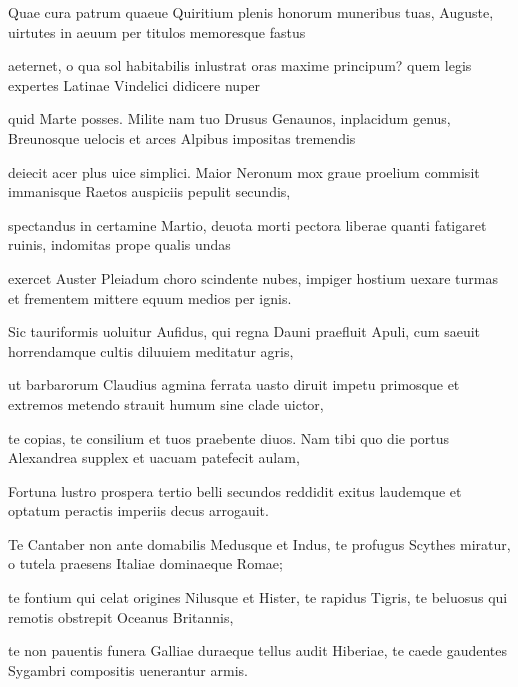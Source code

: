 \documentclass{book}
\newenvironment {carmen} [1] [\relax] 
  {\Titulus \Versus \incipit*\numerus{1}#1}
  {\endVersus}
\newcommand {\Alcaic}    {\Forma \strophae {0 \poena 01 \poena 2}}
\begin{document}
\begin{carmen}[\Alcaic]


Quae cura patrum quaeue Quiritium
 plenis honorum muneribus tuas,
      Auguste, uirtutes in aeuum
      per titulos memoresque fastus
 
aeternet, o qua sol habitabilis               
 inlustrat oras maxime principum?
      quem legis expertes Latinae
      Vindelici didicere nuper
 
quid Marte posses. Milite nam tuo
 Drusus Genaunos, inplacidum genus,               
      Breunosque uelocis et arces
      Alpibus impositas tremendis
 
deiecit acer plus uice simplici.
 Maior Neronum mox graue proelium
      commisit immanisque Raetos               
      auspiciis pepulit secundis,
 
spectandus in certamine Martio,
 deuota morti pectora liberae
      quanti fatigaret ruinis,
      indomitas prope qualis undas               
 
exercet Auster Pleiadum choro
 scindente nubes, impiger hostium
      uexare turmas et frementem
      mittere equum medios per ignis.
 
Sic tauriformis uoluitur Aufidus,                
qui regna Dauni praefluit Apuli,
      cum saeuit horrendamque cultis
      diluuiem meditatur agris,
 
ut barbarorum Claudius agmina
 ferrata uasto diruit impetu               
      primosque et extremos metendo
      strauit humum sine clade uictor,
 
te copias, te consilium et tuos
 praebente diuos. Nam tibi quo die
      portus Alexandrea supplex               
      et uacuam patefecit aulam,
 
Fortuna lustro prospera tertio
 belli secundos reddidit exitus
      laudemque et optatum peractis
      imperiis decus arrogauit.               
 
Te Cantaber non ante domabilis
 Medusque et Indus, te profugus Scythes
      miratur, o tutela praesens
      Italiae dominaeque Romae;
 
te fontium qui celat origines               
 Nilusque et Hister, te rapidus Tigris,
      te beluosus qui remotis
      obstrepit Oceanus Britannis,
 
te non pauentis funera Galliae
 duraeque tellus audit Hiberiae,               
      te caede gaudentes Sygambri
      compositis uenerantur armis.
 

\end{carmen}
\end{document}
